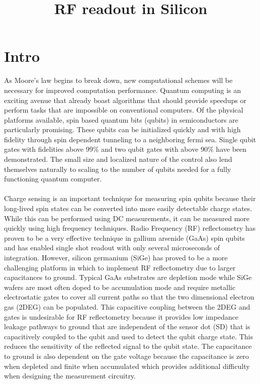 \documentclass{article}
\title{RF readout in Silicon}
\begin{document}
\section{Intro} %
	\label{sec:intro}
	As Moore’s law begins to break down, new computational schemes will be necessary for improved computation performance.  Quantum computing is an exciting avenue that already boast algorithms that should provide speedups or perform tasks that are impossible on conventional computers.  Of the physical platforms available, spin based quantum bits (qubits) in semiconductors are particularly promising.  These qubits can be initialized quickly and with high fidelity through spin dependent tunneling to a neighboring fermi sea.  Single qubit gates with fidelities above 99\% and two qubit gates with above 90\% have been demonstrated.  The small size and localized nature of the control also lend themselves naturally to scaling to the number of qubits needed for a fully functioning quantum computer.   
	\\ \\
	Charge sensing is an important technique for measuring spin qubits because their long-lived spin states can be converted into more easily detectable charge states.  While this can be performed using DC measurements, it can be measured more quickly using high frequency techniques.  Radio Frequency (RF) reflectometry has proven to be a very effective technique in gallium arsenide (GaAs) spin qubits and has enabled single shot readout with only several microseconds of integration.  However, silicon germanium (SiGe) has proved to be a more challenging platform in which to implement RF reflectometry due to larger capacitances to ground.  Typical GaAs substrates are depletion mode while SiGe wafers are most often doped to be accumulation mode and require metallic electrostatic gates to cover all current paths so that the two dimensional electron gas (2DEG) can be populated.  This capacitive coupling between the 2DEG and gates is undesirable for RF reflectometry because it provides low impedance leakage pathways to ground that are independent of the sensor dot (SD) that is capacitively coupled to the qubit and used to detect the qubit charge state.  This reduces the sensitivity of the reflected signal to the qubit state.  The capacitance to ground is also dependent on the gate voltage because the capacitance is zero when depleted and finite when accumulated which provides additional difficulty when designing the measurement circuitry. 
	\\ \\
\end{document}

